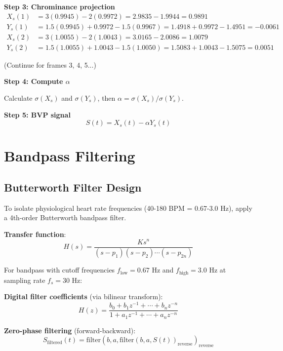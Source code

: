 \documentclass[11pt,a4paper]{article}
\begin{document}
\begin{tcolorbox}[colback=red!5!white,colframe=red!75!black,title=Complete CHROM Example]
\textbf{Step 3: Chrominance projection}
\begin{align*}
X_s(1) &= 3(0.9945) - 2(0.9972) = 2.9835 - 1.9944 = 0.9891 \\
Y_s(1) &= 1.5(0.9945) + 0.9972 - 1.5(0.9967) = 1.4918 + 0.9972 - 1.4951 = -0.0061 \\
X_s(2) &= 3(1.0055) - 2(1.0043) = 3.0165 - 2.0086 = 1.0079 \\
Y_s(2) &= 1.5(1.0055) + 1.0043 - 1.5(1.0050) = 1.5083 + 1.0043 - 1.5075 = 0.0051
\end{align*}

(Continue for frames 3, 4, 5...)

\textbf{Step 4: Compute $\alpha$}

Calculate $\sigma(X_s)$ and $\sigma(Y_s)$, then $\alpha = \sigma(X_s)/\sigma(Y_s)$.

\textbf{Step 5: BVP signal}
\[
S(t) = X_s(t) - \alpha Y_s(t)
\]
\end{tcolorbox}

\section{Bandpass Filtering}

\subsection{Butterworth Filter Design}

To isolate physiological heart rate frequencies (40-180 BPM = 0.67-3.0 Hz), apply a 4th-order Butterworth bandpass filter.

\textbf{Transfer function}:
\begin{equation}
H(s) = \frac{K s^n}{(s - p_1)(s - p_2) \cdots (s - p_{2n})}
\end{equation}

For bandpass with cutoff frequencies $f_{\text{low}} = 0.67$ Hz and $f_{\text{high}} = 3.0$ Hz at sampling rate $f_s = 30$ Hz:

\textbf{Digital filter coefficients} (via bilinear transform):
\begin{equation}
H(z) = \frac{b_0 + b_1 z^{-1} + \cdots + b_n z^{-n}}{1 + a_1 z^{-1} + \cdots + a_n z^{-n}}
\end{equation}

\textbf{Zero-phase filtering} (forward-backward):
\begin{equation}
S_{\text{filtered}}(t) = \text{filter}(b, a, \text{filter}(b, a, S(t))_{\text{reverse}})_{\text{reverse}}
\end{equation}
\end{document}
